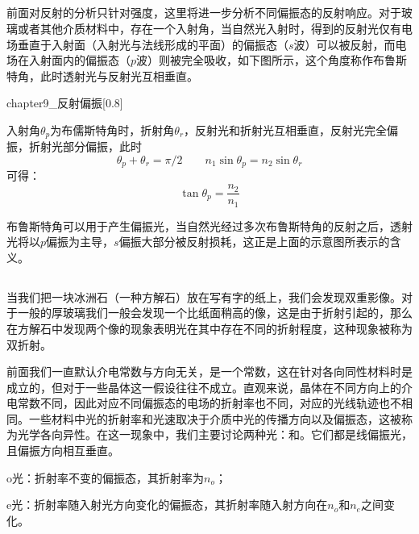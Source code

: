 \subsection[反射偏振]{}
前面对反射的分析只针对强度，这里将进一步分析不同偏振态的反射响应。对于玻璃或者其他介质材料中，存在一个入射角，当自然光入射时，得到的反射光仅有电场垂直于入射面（入射光与法线形成的平面）的偏振态（$s$波）可以被反射，而电场在入射面内的偏振态（$p$波）则被完全吸收，如下图所示，这个角度称作布鲁斯特角，此时透射光与反射光互相垂直。
\begin{singlefigure}[反射过程中的偏振]{chapter9_反射偏振}[0.8]
\end{singlefigure}
\begin{law}
    入射角$\theta_p$为布儒斯特角时，折射角$\theta_r$，反射光和折射光互相垂直，反射光完全偏振，折射光部分偏振，此时
    \[\theta_p + \theta_r = \pi/2\qquad n_1 \sin\theta_p = n_2 \sin\theta_r\]
    可得：
    \[\tan \theta_p = \dfrac{n_2}{n_1}\]
\end{law}

布鲁斯特角可以用于产生偏振光，当自然光经过多次布鲁斯特角的反射之后，透射光将以$p$偏振为主导，$s$偏振大部分被反射损耗，这正是上面的示意图所表示的含义。

\subsection[双折射]{}
当我们把一块冰洲石（一种方解石）放在写有字的纸上，我们会发现双重影像。对于一般的厚玻璃我们一般会发现一个比纸面稍高的像，这是由于折射引起的，那么在方解石中发现两个像的现象表明光在其中存在不同的折射程度，这种现象被称为双折射。

前面我们一直默认介电常数与方向无关，是一个常数，这在针对各向同性材料时是成立的，但对于一些晶体这一假设往往不成立。直观来说，晶体在不同方向上的介电常数不同，因此对应不同偏振态的电场的折射率也不同，对应的光线轨迹也不相同。一些材料中光的折射率和光速取决于介质中光的传播方向以及偏振态，这被称为光学各向异性。在这一现象中，我们主要讨论两种光：和。它们都是线偏振光，且偏振方向相互垂直。
\begin{Itemize}
    \item o光：折射率不变的偏振态，其折射率为$n_o$；
    \item e光：折射率随入射光方向变化的偏振态，其折射率随入射方向在$n_o$和$n_e$之间变化。
\end{Itemize}

